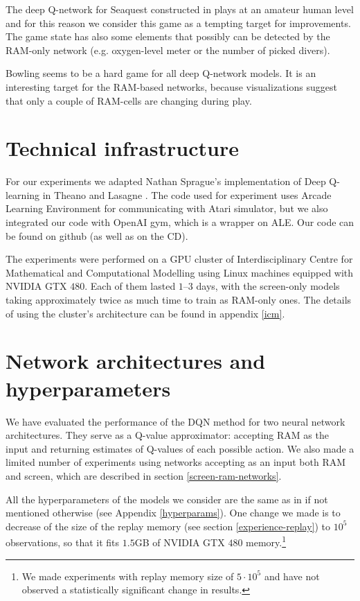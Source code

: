 The deep Q-network for Seaquest constructed in \cite{nips-dqn} plays at an amateur human level and for this reason we consider this game as a tempting target for improvements. The game state has also some elements that possibly can be detected by the RAM-only network (e.g. oxygen-level meter or the number of picked divers).

Bowling seems to be a hard game for all deep Q-network models. It is an interesting target for the RAM-based networks, because visualizations suggest that only a couple of RAM-cells are changing during play.

\section{Technical infrastructure}\label{technical}
For our experiments we adapted Nathan Sprague's implementation of Deep Q-learning \cite{sprague} in Theano \cite{theano} and Lasagne \cite{lasagne}. The code used for experiment uses Arcade Learning Environment \cite{ale} for communicating with Atari simulator, but we also integrated our code with OpenAI gym, which is a wrapper on ALE. Our code can be found on github \cite{our-dqn} (as well as on the CD).

The experiments were performed on a GPU cluster of Interdisciplinary Centre for Mathematical and Computational Modelling using Linux machines equipped with NVIDIA GTX $480$. Each of them lasted $1$--$3$ days, with the screen-only models taking approximately twice as much time to train as RAM-only ones. The details of using the cluster's architecture can be found in appendix \ref{icm}.

\section{Network architectures and hyperparameters}

We have evaluated the performance of the DQN method for two neural network architectures. They serve as a Q-value approximator: accepting RAM as the input and returning estimates of Q-values of each possible action. We also made a limited number of experiments using networks accepting as an input both RAM and screen, which are described in section \ref{screen-ram-networks}.

All the hyperparameters of the models we consider are the same as in \cite{nips-dqn} if not mentioned otherwise (see Appendix \ref{hyperparams}). One change we made is to decrease of the size of the replay memory (see section \ref{experience-replay}) to $10^5$ observations, so that it fits $1.5$GB of NVIDIA GTX $480$ memory.\footnote{We made experiments with replay memory size of $5\cdot 10^5$ and have not observed a statistically significant change in results.}

